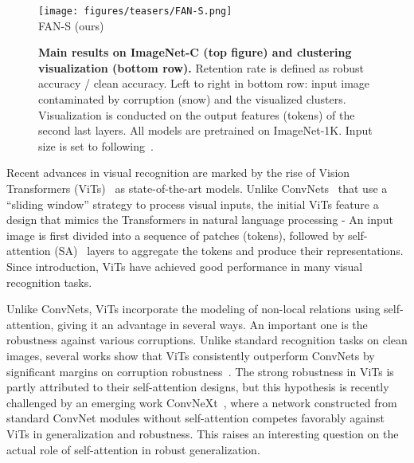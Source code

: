 \documentclass[nohyperref]{article}
\theoremstyle{plain}
\theoremstyle{definition}
\theoremstyle{remark}
\begin{document}
\begin{figure}[!ht]
\begin{minipage}{0.328\linewidth}
        \centering
        \texttt{[image: figures/teasers/FAN-S.png]}\\
        FAN-S (ours)
    \end{minipage}
\caption{\textbf{Main results on ImageNet-C (top figure) and clustering visualization (bottom row).} Retention rate is defined as robust accuracy / clean accuracy. Left to right in bottom row: input image contaminated by corruption (snow) and the visualized clusters. Visualization is conducted on the output features (tokens) of the second last layers. All models are pretrained on ImageNet-1K. Input size is set to  following~\cite{caron2021emerging}. 
}
\label{fig:teaser}
\end{figure}


Recent advances in visual recognition are marked by the rise of Vision Transformers (ViTs)~\cite{dosovitskiy2020image} as state-of-the-art models. Unlike ConvNets~\cite{lecun1989backpropagation,krizhevsky2012imagenet} that use a ``sliding window'' strategy to process visual inputs, the initial ViTs feature a design that mimics the Transformers in natural language processing - An input image is first divided into a sequence of patches (tokens), followed by self-attention (SA)~\cite{vaswani2017attention} layers to aggregate the tokens and produce their representations. Since introduction, ViTs have achieved good performance in many visual recognition tasks.

Unlike ConvNets, ViTs incorporate the modeling of non-local relations using self-attention, giving it an advantage in several ways. 
An important one is the robustness against various corruptions. Unlike standard recognition tasks on clean images, several works show that ViTs consistently outperform ConvNets by significant margins on corruption robustness~\cite{bai2021transformers,xie2021segformer,paul2022vision,naseer2021intriguing}. The strong robustness in ViTs is partly attributed to their self-attention designs, but this hypothesis is recently challenged by an emerging work ConvNeXt~\cite{liu2022convnet}, where a network constructed from standard ConvNet modules without self-attention competes favorably against ViTs in generalization and robustness. This raises an interesting question on the actual role of self-attention in robust generalization.
\end{document}
